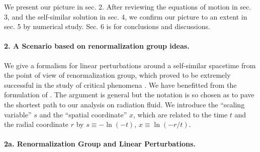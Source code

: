 We present our picture in sec. 2. After reviewing the equations of motion
in sec. 3, and the
self-similar solution in sec. 4, we confirm our picture to an
extent in sec. 5 by numerical study. Sec. 6 is for conclusions and
discussions.



\paragraph*{2. A Scenario based on renormalization group ideas.}
\label{RG}
We give a formalism for linear perturbations around a
self-similar spacetime from the point of view of renormalization
group, which proved to be extremely  successful in the study of
critical phenomena \cite{WK74}.
We have benefitted from the formulation of \cite{BK95}.
The argument is general but the
notation is so chosen as to pave the shortest path
to our analysis on radiation fluid.  We introduce the ``scaling
variable'' $s$ and the ``spatial coordinate'' $x$, which are related to
the time $t$ and the radial coordinate $r$ by $s \equiv - \ln (-t)$,
$x \equiv \ln (- r/t)$.
\paragraph*{2a. Renormalization Group and Linear Perturbations.}

